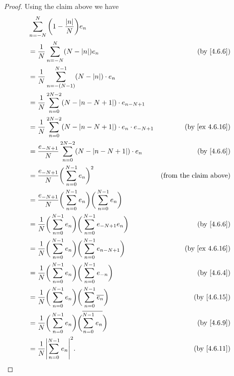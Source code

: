 \begin{proof}
  Using the claim above we have
  \begin{align*}
     & \sum_{n = -N}^N \bigg(1 - \frac{\abs{n}}{N}\bigg) e_n                                                                              \\
     & = \frac{1}{N} \sum_{n = -N}^N (N - \abs{n}) e_n                                                    & \text{(by \cref{4.6.6})}      \\
     & = \frac{1}{N} \sum_{n = -(N - 1)}^{N - 1} (N - \abs{n}) \cdot e_n                                                                  \\
     & = \frac{1}{N} \sum_{n = 0}^{2N - 2} (N - \abs{n - N + 1}) \cdot e_{n - N + 1}                                                      \\
     & = \frac{1}{N} \sum_{n = 0}^{2N - 2} (N - \abs{n - N + 1}) \cdot e_n \cdot e_{-N + 1}               & \text{(by \cref{ex 4.6.16})}  \\
     & = \frac{e_{-N + 1}}{N} \sum_{n = 0}^{2N - 2} (N - \abs{n - N + 1}) \cdot e_n                       & \text{(by \cref{4.6.6})}      \\
     & = \frac{e_{-N + 1}}{N} \bigg(\sum_{n = 0}^{N - 1} e_n\bigg)^2                                      & \text{(from the claim above)} \\
     & = \frac{e_{-N + 1}}{N} \bigg(\sum_{n = 0}^{N - 1} e_n\bigg) \bigg(\sum_{n = 0}^{N - 1} e_n\bigg)                                   \\
     & = \frac{1}{N} \bigg(\sum_{n = 0}^{N - 1} e_n\bigg) \bigg(\sum_{n = 0}^{N - 1} e_{-N + 1} e_n\bigg) & \text{(by \cref{4.6.6})}      \\
     & = \frac{1}{N} \bigg(\sum_{n = 0}^{N - 1} e_n\bigg) \bigg(\sum_{n = 0}^{N - 1} e_{n - N + 1}\bigg)  & \text{(by \cref{ex 4.6.16})}  \\
     & = \frac{1}{N} \bigg(\sum_{n = 0}^{N - 1} e_n\bigg) \bigg(\sum_{n = 0}^{N - 1} e_{-n}\bigg)         & \text{(by \cref{4.6.4})}      \\
     & = \frac{1}{N} \bigg(\sum_{n = 0}^{N - 1} e_n\bigg) \bigg(\sum_{n = 0}^{N - 1} \overline{e_n}\bigg) & \text{(by \cref{4.6.15})}     \\
     & = \frac{1}{N} \bigg(\sum_{n = 0}^{N - 1} e_n\bigg) \bigg(\overline{\sum_{n = 0}^{N - 1} e_n}\bigg) & \text{(by \cref{4.6.9})}      \\
     & = \frac{1}{N} \abs{\sum_{n = 0}^{N - 1} e_n}^2.                                                    & \text{(by \cref{4.6.11})}
  \end{align*}
\end{proof}

